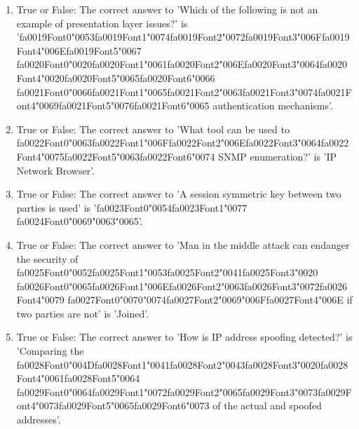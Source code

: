 \documentclass[12pt]{article}
\begin{document}
\begin{enumerate}[label=\arabic*.]
\item True or False: The correct answer to 'Which of the following is not an example of presentation layer issues?' is '{\csname fa0019Font0\endcsname\char"0053}{\csname fa0019Font1\endcsname\char"0074}{\csname fa0019Font2\endcsname\char"0072}{\csname fa0019Font3\endcsname\char"006F}{\csname fa0019Font4\endcsname\char"006E}{\csname fa0019Font5\endcsname\char"0067} {\csname fa0020Font0\endcsname\char"0020}{\csname fa0020Font1\endcsname\char"0061}{\csname fa0020Font2\endcsname\char"006E}{\csname fa0020Font3\endcsname\char"0064}{\csname fa0020Font4\endcsname\char"0020}{\csname fa0020Font5\endcsname\char"0065}{\csname fa0020Font6\endcsname\char"0066} {\csname fa0021Font0\endcsname\char"0066}{\csname fa0021Font1\endcsname\char"0065}{\csname fa0021Font2\endcsname\char"0063}{\csname fa0021Font3\endcsname\char"0074}{\csname fa0021Font4\endcsname\char"0069}{\csname fa0021Font5\endcsname\char"0076}{\csname fa0021Font6\endcsname\char"0065} authentication mechanisms'.
\item True or False: The correct answer to 'What tool can be used to {\csname fa0022Font0\endcsname\char"0063}{\csname fa0022Font1\endcsname\char"006F}{\csname fa0022Font2\endcsname\char"006E}{\csname fa0022Font3\endcsname\char"0064}{\csname fa0022Font4\endcsname\char"0075}{\csname fa0022Font5\endcsname\char"0063}{\csname fa0022Font6\endcsname\char"0074} SNMP enumeration?' is 'IP Network Browser'.
\item True or False: The correct answer to 'A session symmetric key between two parties is used' is '{\csname fa0023Font0\endcsname\char"0054}{\csname fa0023Font1\endcsname\char"0077} {\csname fa0024Font0\endcsname\char"0069}{\char"0063}{\char"0065}'.
\item True or False: The correct answer to 'Man in the middle attack can endanger the security of {\csname fa0025Font0\endcsname\char"0052}{\csname fa0025Font1\endcsname\char"0053}{\csname fa0025Font2\endcsname\char"0041}{\csname fa0025Font3\endcsname\char"0020} {\csname fa0026Font0\endcsname\char"0065}{\csname fa0026Font1\endcsname\char"006E}{\csname fa0026Font2\endcsname\char"0063}{\csname fa0026Font3\endcsname\char"0072}{\csname fa0026Font4\endcsname\char"0079} {\csname fa0027Font0\endcsname\char"0070}{\char"0074}{\csname fa0027Font2\endcsname\char"0069}{\char"006F}{\csname fa0027Font4\endcsname\char"006E} if two parties are not' is 'Joined'.
\item True or False: The correct answer to 'How is IP address spoofing detected?' is 'Comparing the {\csname fa0028Font0\endcsname\char"004D}{\csname fa0028Font1\endcsname\char"0041}{\csname fa0028Font2\endcsname\char"0043}{\csname fa0028Font3\endcsname\char"0020}{\csname fa0028Font4\endcsname\char"0061}{\csname fa0028Font5\endcsname\char"0064} {\csname fa0029Font0\endcsname\char"0064}{\csname fa0029Font1\endcsname\char"0072}{\csname fa0029Font2\endcsname\char"0065}{\csname fa0029Font3\endcsname\char"0073}{\csname fa0029Font4\endcsname\char"0073}{\csname fa0029Font5\endcsname\char"0065}{\csname fa0029Font6\endcsname\char"0073} of the actual and spoofed addresses'.

\end{enumerate}
\end{document}
